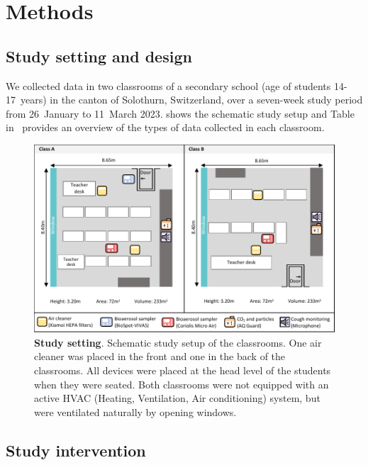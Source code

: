 \documentclass[fleqn,11pt]{wlscirep}
\begin{document}
\newpage

\section{Methods}

\subsection{Study setting and design} 

\noindent We collected data in two classrooms of a secondary school (age of students 14-17~years) in the canton of Solothurn, Switzerland, over a seven-week study period from 26~January to 11~March 2023.  shows the schematic study setup and Table~ in \supp \, provides an overview of the types of data collected in each classroom.

\begin{figure}[!htpb]
    \centering
    \includegraphics{../study_setting.pdf}
    \caption{\textbf{Study setting}. Schematic study setup of the classrooms. One air cleaner was placed in the front and one in the back of the classrooms. All devices were placed at the head level of the students when they were seated. Both classrooms were not equipped with an active HVAC (Heating, Ventilation, Air conditioning) system, but were ventilated naturally by opening windows. }
    \label{fig:study-setup}
\end{figure}

\subsection{Study intervention} 
\end{document}
